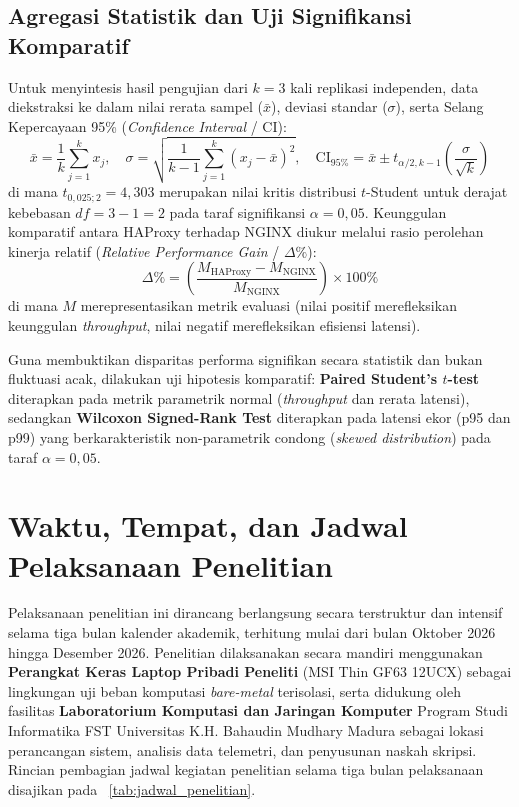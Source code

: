 \subsection{Agregasi Statistik dan Uji Signifikansi Komparatif}
Untuk menyintesis hasil pengujian dari $k = 3$ kali replikasi independen, data diekstraksi ke dalam nilai rerata sampel ($\bar{x}$), deviasi standar ($\sigma$), serta Selang Kepercayaan 95\% (\textit{Confidence Interval} / CI):
\begin{equation}
    \bar{x} = \frac{1}{k} \sum_{j=1}^{k} x_j, \quad \sigma = \sqrt{\frac{1}{k-1} \sum_{j=1}^{k} (x_j - \bar{x})^2}, \quad \text{CI}_{95\%} = \bar{x} \pm t_{\alpha/2, k-1} \left( \frac{\sigma}{\sqrt{k}} \right)
    \label{eq:rerata_dan_ci}
\end{equation}
di mana $t_{0{,}025; 2} = 4{,}303$ merupakan nilai kritis distribusi $t$-Student untuk derajat kebebasan $df = 3 - 1 = 2$ pada taraf signifikansi $\alpha = 0{,}05$. Keunggulan komparatif antara HAProxy terhadap NGINX diukur melalui rasio perolehan kinerja relatif (\textit{Relative Performance Gain} / $\Delta\%$):
\begin{equation}
    \Delta\% = \left( \frac{M_{\text{HAProxy}} - M_{\text{NGINX}}}{M_{\text{NGINX}}} \right) \times 100\%
    \label{eq:relative_gain}
\end{equation}
di mana $M$ merepresentasikan metrik evaluasi (nilai positif merefleksikan keunggulan \textit{throughput}, nilai negatif merefleksikan efisiensi latensi).

Guna membuktikan disparitas performa signifikan secara statistik dan bukan fluktuasi acak, dilakukan uji hipotesis komparatif: \textbf{Paired Student's $t$-test} diterapkan pada metrik parametrik normal (\textit{throughput} dan rerata latensi), sedangkan \textbf{Wilcoxon Signed-Rank Test} diterapkan pada latensi ekor (p95 dan p99) yang berkarakteristik non-parametrik condong (\textit{skewed distribution}) \citep{li2025tailbench} pada taraf $\alpha = 0{,}05$.

\section{Waktu, Tempat, dan Jadwal Pelaksanaan Penelitian}
Pelaksanaan penelitian ini dirancang berlangsung secara terstruktur dan intensif selama tiga bulan kalender akademik, terhitung mulai dari bulan Oktober 2026 hingga Desember 2026. Penelitian dilaksanakan secara mandiri menggunakan \textbf{Perangkat Keras Laptop Pribadi Peneliti} (MSI Thin GF63 12UCX) sebagai lingkungan uji beban komputasi \textit{bare-metal} terisolasi, serta didukung oleh fasilitas \textbf{Laboratorium Komputasi dan Jaringan Komputer} Program Studi Informatika FST Universitas K.H. Bahaudin Mudhary Madura sebagai lokasi perancangan sistem, analisis data telemetri, dan penyusunan naskah skripsi. Rincian pembagian jadwal kegiatan penelitian selama tiga bulan pelaksanaan disajikan pada \tablename\ \ref{tab:jadwal_penelitian}.

